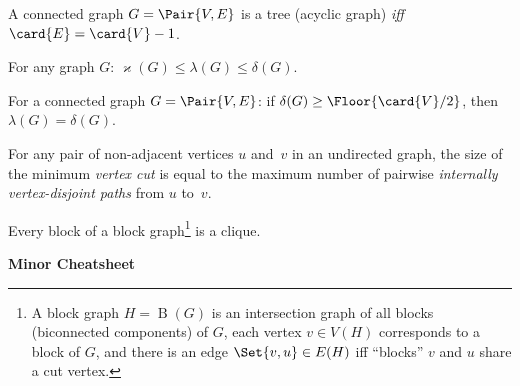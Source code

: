 \documentclass[a4paper,12pt]{article}
\newcommand{\op}[1]{\operatorname*{#1}}
\newcommand{\minDegree}[1]{\delta(#1)}
\newcommand{\vertexConnectivity}[1]{\varkappa(#1)}
\newcommand{\edgeConnectivity}[1]{\lambda(#1)}
\newcommand{\blockGraph}[1]{\op{B}(#1)}
\begin{document}
\begin{tasks}

    \begin{theorem}[Tree]
        A connected graph $G = \Pair{V, E}$ is a tree (\ie acyclic graph) \emph{iff} $\card{E} = \card{V} - 1$.
    \end{theorem}

    \begin{theorem}[Whitney]
        For any graph $G$: $\vertexConnectivity{G} \leq \edgeConnectivity{G} \leq \minDegree{G}$.
    \end{theorem}

    \begin{theorem}[Chartrand]
        For a connected graph $G = \Pair{V, E}$: if $\minDegree{G} \geq \Floor{\card{V} / 2}$, then $\edgeConnectivity{G} = \minDegree{G}$.
    \end{theorem}

    \begin{theorem}[Menger]
        For any pair of non-adjacent vertices $u$ and~$v$ in an undirected graph, the size of the minimum \emph{vertex cut} is equal to the maximum number of pairwise \emph{internally vertex-disjoint paths} from $u$ to~$v$.
    \end{theorem}

    \begin{theorem}[Harary]
        Every block of a block graph\footnote{A block graph $H = \blockGraph{G}$ is an intersection graph of all blocks (biconnected components) of $G$, \ie each vertex $v \in V(H)$ corresponds to a block of $G$, and there is an edge $\Set{v,u} \in E(H)$ iff \enquote{blocks} $v$ and $u$ share a cut vertex.} is a clique.
    \end{theorem}

\end{tasks}


\newpage

\centerline{\textbf{Minor Cheatsheet}}
\end{document}
